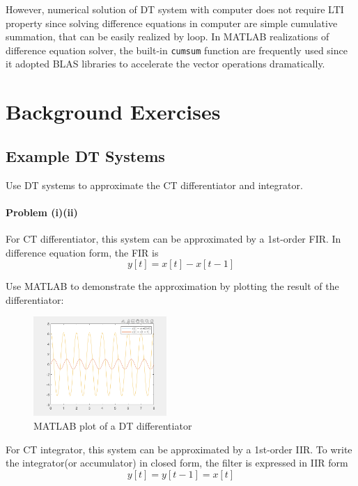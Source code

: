 \documentclass[conference]{IEEEtran}
\begin{document}
However, numerical solution of DT system with computer does not require LTI property since solving difference equations in computer are simple cumulative summation, that can be easily realized by loop. In MATLAB realizations of difference equation solver, the built-in \lstinline{cumsum} function are frequently used since it adopted BLAS libraries to accelerate the vector operations dramatically.

\section{Background Exercises}

\subsection{Example DT Systems}

Use DT systems to approximate the CT differentiator and integrator.

\paragraph{Problem (i)(ii)}

For CT differentiator, this system can be approximated by a 1st-order FIR. In difference equation form, the FIR is
\begin{equation}
	y[t]=x[t]-x[t-1]
\end{equation}\pagebreak

Use MATLAB to demonstrate the approximation by plotting the result of the differentiator:
\begin{figure}[htpb]
	\begin{center}
		\includegraphics[width=0.45\textwidth]{../matlab/q221_1.png}
		\caption{MATLAB plot of a DT differentiator}
		\label{fig:1}
	\end{center}
\end{figure}

For CT integrator, this system can be approximated by a 1st-order IIR. To write the integrator(or accumulator) in closed form, the filter is expressed in IIR form
\begin{equation}
	y[t]=y[t-1]=x[t]
\end{equation}
\end{document}
